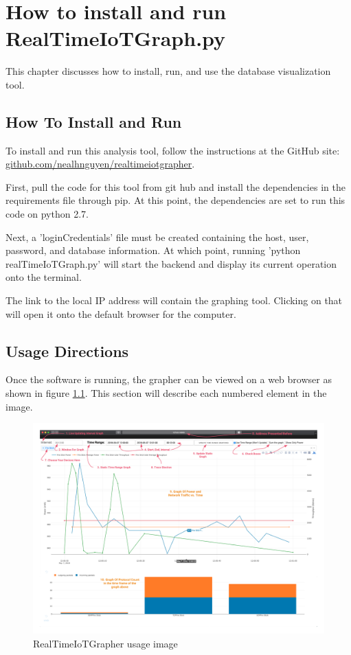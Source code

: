 \chapter{How to install and run RealTimeIoTGraph.py}
\label{How to install and run RealTimeIoTGraph.py}
%
This chapter discusses how to install, run, and use the database visualization tool.

\section{How To Install and Run}
To install and run this analysis tool, follow the instructions at the GitHub site:   \href{https://github.com/nealhnguyen/RealTimeIoTGrapher}{github.com/nealhnguyen/realtimeiotgrapher}.

First, pull the code for this tool from git hub and install the dependencies in the requirements file through pip. At this point, the dependencies are set to run this code on python 2.7.

Next, a 'loginCredentials' file must be created containing the host, user, password, and database information. At which point, running 'python realTimeIoTGraph.py' will start the backend and display its current operation onto the terminal.

The link to the local IP address will contain the graphing tool. Clicking on that will open it onto the default browser for the computer.

\section{Usage Directions}
Once the software is running, the grapher can be viewed on a web browser as shown in figure \ref{fig:grapherUsage}. This section will describe each numbered element in the image.

\begin{figure}[H]
    \centering
    \includegraphics[width=1\textwidth]{figures/grapherUsage.png}
    \caption{RealTimeIoTGrapher usage image}
    \label{fig:grapherUsage}
\end{figure}

